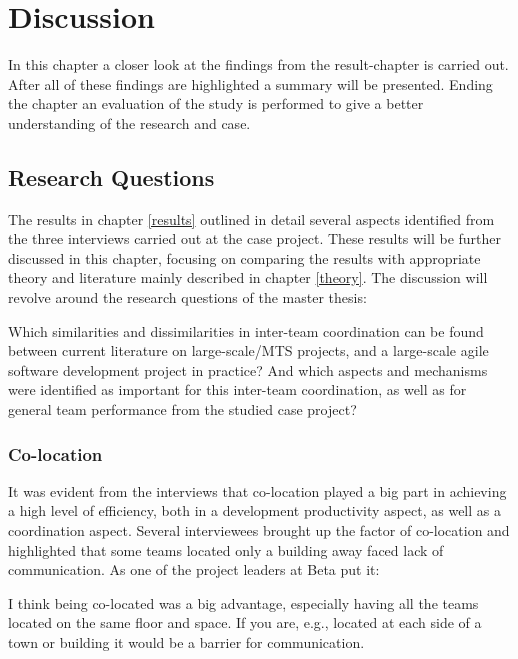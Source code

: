 \chapter{Discussion}
\label{disc}

\minitoc

In this chapter a closer look at the findings from the result-chapter is carried out. After all of these findings are highlighted a summary will be presented. Ending the chapter an evaluation of the study is performed to give a better understanding of the research and case.

\newpage

\section{Research Questions}

The results in chapter \ref{results} outlined in detail several aspects identified from the three interviews carried out at the case project. These results will be further discussed in this chapter, focusing on comparing the results with appropriate theory and literature mainly described in chapter \ref{theory}. The discussion will revolve around the research questions of the master thesis:

\begin{fancyquotes}
Which similarities and dissimilarities in inter-team coordination can be found between current literature on large-scale/MTS projects, and a large-scale agile software development project in practice? And which aspects and mechanisms were identified as important for this inter-team coordination, as well as for general team performance from the studied case project?
\end{fancyquotes}

\subsection{Co-location}

It was evident from the interviews that co-location played a big part in achieving a high level of efficiency, both in a development productivity aspect, as well as a coordination aspect. Several interviewees brought up the factor of co-location and highlighted that some teams located only a building away faced lack of communication. As one of the project leaders at Beta put it:

\begin{fancyquotes}
I think being co-located was a big advantage, especially having all the teams located on the same floor and space. If you are, e.g., located at each side of a town or building it would be a barrier for communication.
\end{fancyquotes}

